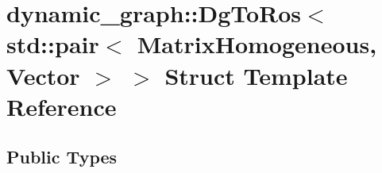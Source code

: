 \hypertarget{structdynamic__graph_1_1DgToRos_3_01std_1_1pair_3_01MatrixHomogeneous_00_01Vector_01_4_01_4}{}\section{dynamic\+\_\+graph\+:\+:Dg\+To\+Ros$<$ std\+:\+:pair$<$ Matrix\+Homogeneous, Vector $>$ $>$ Struct Template Reference}
\label{structdynamic__graph_1_1DgToRos_3_01std_1_1pair_3_01MatrixHomogeneous_00_01Vector_01_4_01_4}
\subsection*{Public Types}
